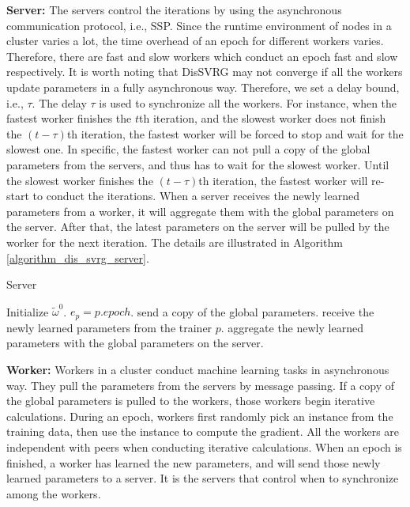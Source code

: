 \documentclass[preprint,review,11pt,a4paper]{elsarticle}
\begin{document}
\textbf{Server:}    The servers control the iterations by using the asynchronous communication protocol, i.e., SSP.  Since the runtime environment of nodes in a cluster varies a lot, the  time overhead of an epoch for different workers  varies. Therefore, there are fast and slow workers which conduct an epoch fast and slow respectively.   It is worth noting that DisSVRG may not converge if all the workers update parameters in a fully asynchronous way. Therefore, we set a delay bound, i.e., $\tau$. The delay $\tau$ is used to synchronize all the workers. For instance, when the fastest worker finishes the $t$th iteration, and the slowest worker does not finish the $(t-\tau)$th iteration, the fastest worker will be forced to stop and wait for the slowest one. In specific, the fastest worker can not  pull a copy of the global parameters from the servers, and thus has to wait for the slowest worker. Until the slowest worker finishes the $(t-\tau)$th iteration, the fastest worker will re-start to conduct the iterations. When a server receives the newly learned parameters from a worker, it will aggregate them with the global parameters on the server. After that, the latest parameters on the server will be pulled by the worker for the next iteration.
The details are illustrated in Algorithm \ref{algorithm_dis_svrg_server}.

\begin{algorithm}[t]
    \caption{Server}
    \label{algorithm_dis_svrg_server}
    \begin{algorithmic}[1]
        \State Initialize $\tilde{\omega}^0$.
               \State $e_p=p.epoch$.
                    \State send a copy of the global parameters.
                \EndIf
            \EndIf
                \State receive the newly learned parameters from the trainer $p$.
                \State aggregate the newly learned parameters with the global parameters on the server.
            \EndIf
        \EndWhile
    \end{algorithmic}
\end{algorithm}

\textbf{Worker:} Workers in a cluster conduct machine learning tasks in asynchronous way. They pull the parameters from the servers by message passing. If a  copy of the global parameters is pulled to the workers, those workers begin iterative calculations. During an epoch, workers first randomly pick an instance from the training data, then use the instance to compute the gradient.  All the workers are independent with peers when conducting iterative calculations. When an epoch is finished, a worker has learned the new parameters, and will send those newly learned parameters to a server. It is the servers that control when to synchronize among the workers.
\end{document}
